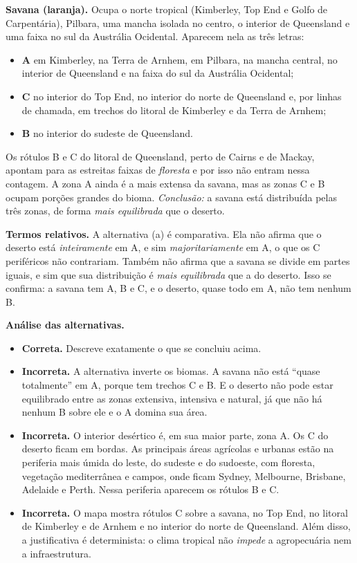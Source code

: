\documentclass{article}%
\begin{document}
\textbf{Savana (laranja).} Ocupa o norte tropical (Kimberley, Top End e Golfo de Carpentária), Pilbara, uma mancha isolada no centro, o interior de Queensland e uma faixa no sul da Austrália Ocidental. Aparecem nela as três letras:
\begin{itemize}
\item \textbf{A} em Kimberley, na Terra de Arnhem, em Pilbara, na mancha central, no interior de Queensland e na faixa do sul da Austrália Ocidental;
\item \textbf{C} no interior do Top End, no interior do norte de Queensland e, por linhas de chamada, em trechos do litoral de Kimberley e da Terra de Arnhem;
\item \textbf{B} no interior do sudeste de Queensland.
\end{itemize}
Os rótulos B e C do litoral de Queensland, perto de Cairns e de Mackay, apontam para as estreitas faixas de \emph{floresta} e por isso não entram nessa contagem. A zona A ainda é a mais extensa da savana, mas as zonas C e B ocupam porções grandes do bioma. \emph{Conclusão:} a savana está distribuída pelas três zonas, de forma \emph{mais equilibrada} que o deserto.

\textbf{Termos relativos.} A alternativa (a) é comparativa. Ela não afirma que o deserto está \emph{inteiramente} em A, e sim \emph{majoritariamente} em A, o que os C periféricos não contrariam. Também não afirma que a savana se divide em partes iguais, e sim que sua distribuição é \emph{mais equilibrada} que a do deserto. Isso se confirma: a savana tem A, B e C, e o deserto, quase todo em A, não tem nenhum B.

\textbf{Análise das alternativas.}
\begin{itemize}
\item[(a)] \textbf{Correta.} Descreve exatamente o que se concluiu acima.
\item[(b)] \textbf{Incorreta.} A alternativa inverte os biomas. A savana não está ``quase totalmente'' em A, porque tem trechos C e B. E o deserto não pode estar equilibrado entre as zonas extensiva, intensiva e natural, já que não há nenhum B sobre ele e o A domina sua área.
\item[(c)] \textbf{Incorreta.} O interior desértico é, em sua maior parte, zona A. Os C do deserto ficam em bordas. As principais áreas agrícolas e urbanas estão na periferia mais úmida do leste, do sudeste e do sudoeste, com floresta, vegetação mediterrânea e campos, onde ficam Sydney, Melbourne, Brisbane, Adelaide e Perth. Nessa periferia aparecem os rótulos B e C.
\item[(d)] \textbf{Incorreta.} O mapa mostra rótulos C sobre a savana, no Top End, no litoral de Kimberley e de Arnhem e no interior do norte de Queensland. Além disso, a justificativa é determinista: o clima tropical não \emph{impede} a agropecuária nem a infraestrutura.
\end{itemize}
\end{document}
